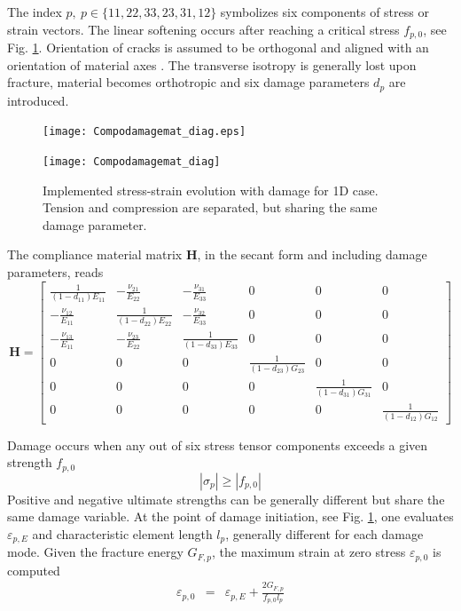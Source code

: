 \documentclass[a4paper]{article}
\begin{document}
The index $p,~p\in\{11,22,33,23,31,12\}$ symbolizes six components of stress or strain vectors. The linear softening occurs after reaching a critical stress $f_{p,0}$, see Fig. \ref{comp_softening}. Orientation of cracks is assumed to be orthogonal and aligned with an orientation of material axes \cite[pp.236]{Bazant:98}. The transverse isotropy is generally lost upon fracture, material becomes orthotropic and six damage parameters $d_p$ are introduced.

\begin{figure}[!htb]
\begin{htmlonly}
  \centerline{\texttt{[image: Compodamagemat\_diag.eps]}}
\end{htmlonly}
 \centerline{\texttt{[image: Compodamagemat\_diag]}}
  \caption{Implemented stress-strain evolution with damage for 1D case. Tension and compression are separated, but sharing the same damage parameter.}
  \label{comp_softening}
\end{figure}

The compliance material matrix $\mathbf{H}$, in the secant form and including damage parameters, reads
\footnotesize
\begin{equation}
\mathbf{H}=
\left[ \begin{array}{cccccc}
\frac{1}{(1-d_{11})E_{11}} & -\frac{\nu_{21}}{E_{22}} & -\frac{\nu_{31}}{E_{33}} &0 &0 & 0\\
-\frac{\nu_{12}}{E_{11}} & \frac{1}{(1-d_{22})E_{22}} & -\frac{\nu_{32}}{E_{33}} &0& 0&0\\
-\frac{\nu_{13}}{E_{11}} & -\frac{\nu_{23}}{E_{22}} & \frac{1}{(1-d_{33})E_{33}} &0 &0 &0 \\
 0&0 &0 & \frac{1}{(1-d_{23})G_{23}} & 0&0 \\
 0& 0& 0& 0& \frac{1}{(1-d_{31})G_{31}} & 0\\
 0& 0&0 &0& 0& \frac{1}{(1-d_{12})G_{12}}
\end{array} \right]\label{comp_eq_H}
\end{equation}
\normalsize

Damage occurs when any out of six stress tensor components exceeds a given strength $f_{p,0}$
\begin{equation}
|\sigma_p| \geq |f_{p,0}|
\end{equation}
Positive and negative ultimate strengths can be generally different but share the same damage variable.
At the point of damage initiation, see Fig. \ref{comp_softening}, one evaluates $\varepsilon_{p,E}$ and characteristic element length $l_p$, generally different for each damage mode. Given the fracture energy $G_{F,p}$, the maximum strain at zero stress $\varepsilon_{p,0}$ is computed
\begin{eqnarray}
\varepsilon_{p,0} &=& \varepsilon_{p,E} + \frac{2G_{F,p}}{f_{p,0} l_p}
\end{eqnarray}
\end{document}
